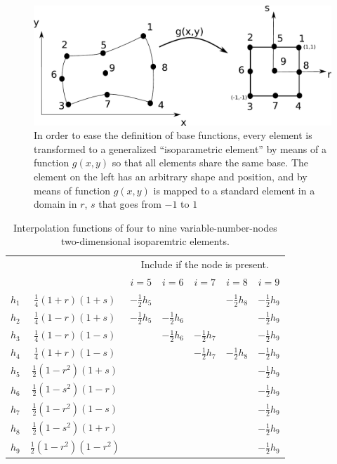 \begin{figure}
\centering
\includegraphics[scale=0.5]{./img/2D_gen_elem.pdf}
\caption{In order to ease the definition of base functions, every element is transformed to a generalized ``isoparametric element'' by means of a function $g(x,y)$ \cite{Bathe1996} so that all elements share the same base. The element on the left has an arbitrary shape and position, and by means of function $g(x,y)$ is mapped to a standard element in a domain in $r$, $s$ that goes from $-1$ to $1$ }
\end{figure}
\begin{center}
\begin{table}
\centering
    \begin{tabular}{r|c|c|c|c|c|c|}
       \multicolumn{2}{c}{~} & \multicolumn{5}{c}{Include if the node is present.}\\
       \multicolumn{1}{c}{~} & \multicolumn{1}{c|}{~} & $i=5$ & $i=6$ & $i=7$ & $i=8$ & $i=9$ \\      
    $h_1$ & $\frac{1}{4}\left(1+r\right)\left(1+s\right)$    & $-\frac{1}{2}h_5$ & ~     & ~ & $-\frac{1}{2}h_8$ & $-\frac{1}{2}h_9$ \\
    $h_2$ & $\frac{1}{4}\left(1-r\right)\left(1+s\right)$    & $-\frac{1}{2}h_5$ & $-\frac{1}{2}h_6$     &  &  & $-\frac{1}{2}h_9$ \\
    $h_3$ & $\frac{1}{4}\left(1-r\right)\left(1-s\right)$    &     & $-\frac{1}{2}h_6$ & $-\frac{1}{2}h_7$ &  & $-\frac{1}{2}h_9$ \\
    $h_4$ & $\frac{1}{4}\left(1+r\right)\left(1-s\right)$    &      &      & $-\frac{1}{2}h_7$ & $-\frac{1}{2}h_8$ & $-\frac{1}{2}h_9$ \\
    $h_5$ & $\frac{1}{2}\left(1-r^2\right)\left(1+s\right)$  &  & & &  & $-\frac{1}{2}h_9$ \\
    $h_6$ & $\frac{1}{2}\left(1-s^2\right)\left(1-r\right)$  & & &  &  & $-\frac{1}{2}h_9$ \\
    $h_7$ & $\frac{1}{2}\left(1-r^2\right)\left(1-s\right)$  & & & & &$-\frac{1}{2}h_9$ \\
    $h_8$ & $\frac{1}{2}\left(1-s^2\right)\left(1+r\right)$  & & & & & $-\frac{1}{2}h_9$ \\
    $h_9$ & $\frac{1}{2}\left(1-r^2\right)\left(1-r^2\right)$& & & & & $-\frac{1}{2}h_9$\\
    \end{tabular}
\caption{Interpolation functions of four to nine variable-number-nodes two-dimensional isoparemtric elements.}
\label{tab:int_funct}
\end{table}
\end{center}
